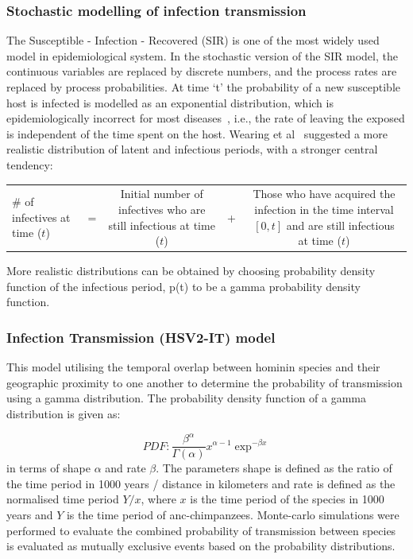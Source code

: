 \documentclass[fleqn,10pt]{wlscirep}
\begin{document}
\subsubsection*{Stochastic modelling of infection transmission}
The Susceptible - Infection - Recovered (SIR) is one of the most widely used model in epidemiological system. In the stochastic version of the SIR model, the continuous variables are replaced by discrete numbers, and the process rates are replaced by process probabilities. At time `t' the probability of a new susceptible host is infected is modelled as an exponential distribution, which is epidemiologically incorrect for most diseases~\cite{Wearing2005,Bailey1975,sartwell1950distribution}, i.e., the rate of leaving the exposed is independent of the time spent on the host. Wearing et al~\cite{Wearing2005} suggested a more realistic distribution of latent and infectious periods, with a stronger central tendency:

\begin{table}[!h]
	\centering
	\renewcommand{\arraystretch}{1.5}
	\begin{tabulary}{\linewidth}{LCCCC}
		\# of infectives at time ($t$) & =  & 
		Initial number of infectives who are still infectious at time ($t$) & + & 
 Those who have acquired the infection in the time interval $[0, t]$ and are still infectious at time ($t$)			\\ 
\end{tabulary}
\end{table}

More realistic distributions can be obtained by choosing  probability density function of the infectious period,  p(t) to be a gamma probability density function\cite{Blythe1988,Lloyd2001}.

\subsubsection*{Infection Transmission (HSV2-IT) model}
This model utilising the temporal overlap between hominin species and their geographic proximity to one another to determine the probability of transmission using a gamma distribution. The probability density function of a gamma distribution is given as:

\begin{equation}
PDF:\frac{\beta^\alpha}{\Gamma(\alpha)}x^{\alpha - 1} \exp^{-\beta x}
\end{equation}
in terms of shape $\alpha$ and rate $\beta$. The parameters shape is defined as the ratio of the time period in 1000 years / distance in kilometers and  rate  is defined as the normalised time period $Y / x$, where $x$ is the time period of the species in 1000 years and $Y$ is the time period of anc-chimpanzees. Monte-carlo simulations were performed to evaluate the combined probability of transmission between species is evaluated as mutually exclusive events based on the probability distributions. 
\end{document}
